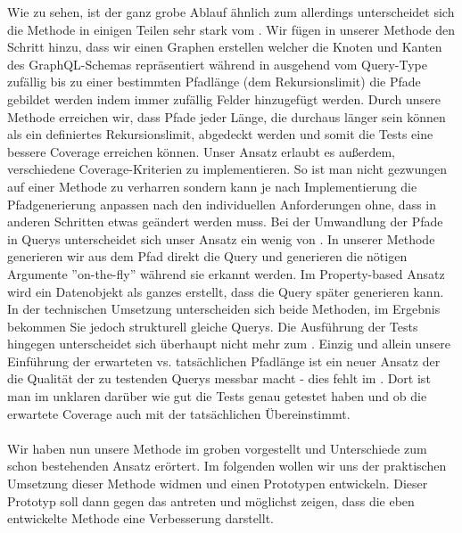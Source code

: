 Wie zu sehen, ist der ganz grobe Ablauf ähnlich zum \cite[Property-based Testing]{property-based-testing} allerdings unterscheidet sich die
Methode in einigen Teilen sehr stark vom \cite[Property-based Testing]{property-based-testing}.
Wir fügen in unserer Methode den Schritt hinzu, dass wir einen Graphen erstellen welcher die Knoten und Kanten des GraphQL-Schemas repräsentiert
während in \cite[Property-based Testing]{property-based-testing} ausgehend vom Query-Type zufällig bis zu einer bestimmten Pfadlänge (dem Rekursionslimit)
die Pfade gebildet werden indem immer zufällig Felder hinzugefügt werden.
Durch unsere Methode erreichen wir, dass Pfade jeder Länge, die durchaus länger sein können als ein definiertes Rekursionslimit, abgedeckt werden und
somit die Tests eine bessere Coverage erreichen können.
Unser Ansatz erlaubt es außerdem, verschiedene Coverage-Kriterien zu implementieren.
So ist man nicht gezwungen auf einer Methode zu verharren sondern kann je nach Implementierung die Pfadgenerierung anpassen nach den individuellen
Anforderungen ohne, dass in anderen Schritten etwas geändert werden muss.
Bei der Umwandlung der Pfade in Querys unterscheidet sich unser Ansatz ein wenig von \cite[Property-based Testing]{property-based-testing}.
In unserer Methode generieren wir aus dem Pfad direkt die Query und generieren die nötigen Argumente ''on-the-fly'' während sie erkannt werden.
Im Property-based Ansatz wird ein Datenobjekt als ganzes erstellt, dass die Query später generieren kann.
In der technischen Umsetzung unterscheiden sich beide Methoden, im Ergebnis bekommen Sie jedoch strukturell gleiche Querys.
Die Ausführung der Tests hingegen unterscheidet sich überhaupt nicht mehr zum \cite[Property-based Testing]{property-based-testing}.
Einzig und allein unsere Einführung der erwarteten vs. tatsächlichen Pfadlänge ist ein neuer Ansatz der die Qualität der zu testenden Querys
messbar macht - dies fehlt im \cite[Property-based Testing]{property-based-testing}.
Dort ist man im unklaren darüber wie gut die Tests genau getestet haben und ob die erwartete Coverage auch mit der tatsächlichen Übereinstimmt.
\\
\\
Wir haben nun unsere Methode im groben vorgestellt und Unterschiede zum schon bestehenden Ansatz \cite[Property-based Testing]{property-based-testing} erörtert.
Im folgenden wollen wir uns der praktischen Umsetzung dieser Methode widmen und einen Prototypen entwickeln.
Dieser Prototyp soll dann gegen das \cite[Property-based Testing Tool]{property-based-testing} antreten und möglichst zeigen, dass die eben entwickelte Methode
eine Verbesserung darstellt.






